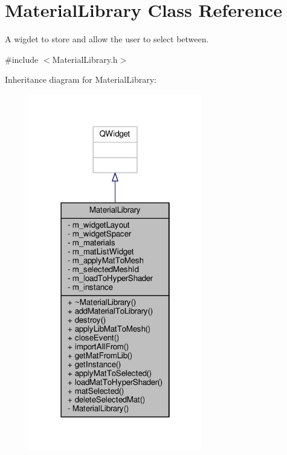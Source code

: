 \hypertarget{class_material_library}{\section{Material\-Library Class Reference}
\label{class_material_library}
}


A wigdet to store and allow the user to select between.  




{\ttfamily \#include $<$Material\-Library.\-h$>$}



Inheritance diagram for Material\-Library\-:
\nopagebreak
\begin{figure}[H]
\begin{center}
\leavevmode
\includegraphics[width=214pt]{class_material_library__inherit__graph}
\end{center}
\end{figure}


